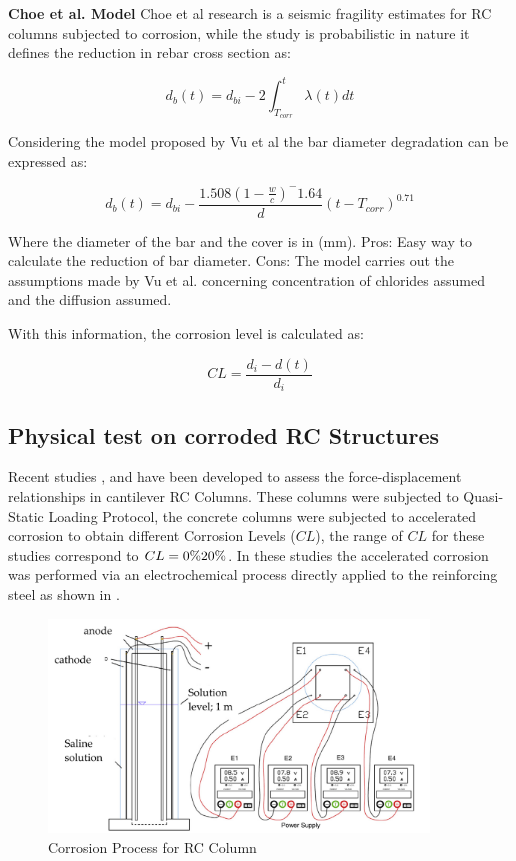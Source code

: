 \:
\textbf{Choe et al. Model }
\:
Choe et al research is a seismic fragility estimates for RC columns subjected to corrosion, while the study is probabilistic in nature it defines the reduction in rebar cross section as:

\begin{equation}
	d_{b}(t)=d_{bi}-2\int_{T_{corr}}^{t} \lambda(t) dt
\end{equation}

Considering the model proposed by Vu et al the bar diameter degradation can be expressed as:

\begin{equation}
	d_{b}(t)=d_{bi}-\frac{1.508(1-\frac{w}{c})^-1.64}{d}(t-T_{corr})^0.71
\end{equation}

Where the diameter of the bar and the cover is in (mm).
Pros:
Easy way to calculate the reduction of bar diameter.
Cons:
The model carries out the assumptions made by Vu et al. concerning concentration of chlorides assumed and the diffusion assumed.

With this information, the corrosion level is calculated as:

\begin{equation}
	CL=\frac{d_{i}-d(t)}{d_{i}}
\end{equation}

\subsection{Physical test on corroded RC Structures}


Recent studies \cite{Ma2012}, \cite{Meda2014} and \cite{Yang2016} have been developed to assess the force-displacement relationships in cantilever RC Columns. These columns were subjected to Quasi-Static Loading Protocol, the concrete columns were subjected to accelerated corrosion to obtain different Corrosion Levels ($CL$), the range of $CL$ for these studies correspond to $CL=0\%\-20\%$. In these studies the accelerated corrosion was performed via an electrochemical process directly applied to the reinforcing steel as shown in .

\begin{figure}[htbp]
	\centering
	\includegraphics[width=0.9\textwidth]{Chapter-4/figs/Meda_Corrosion}
	\caption{Corrosion Process for RC Column \cite{Meda2014}}
	\label{fig:Meda_RC_CorrosionProc}
\end{figure}


